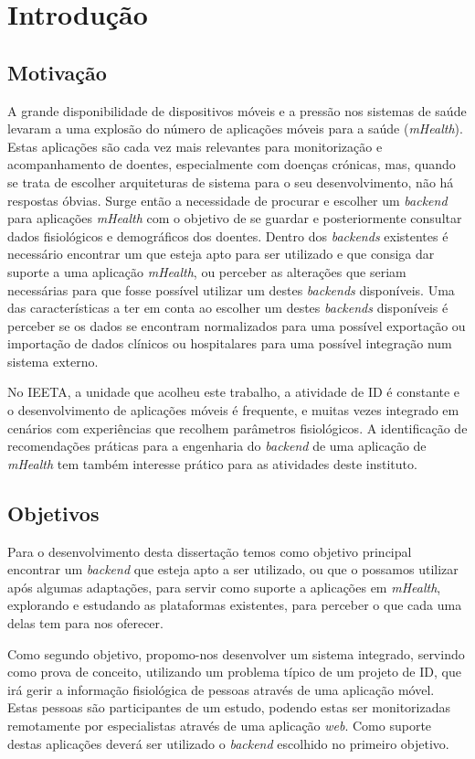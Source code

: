 \chapter{Introdu\c c\~ao}

\section{Motivação}

A grande disponibilidade de dispositivos móveis e a pressão nos sistemas de saúde levaram a uma explosão do número de aplicações móveis para a saúde (\textit{mHealth}). Estas aplicações são cada vez mais relevantes para monitorização e acompanhamento de doentes, especialmente com doenças crónicas\cite{mHealth-chronic-disease}, mas, quando se trata de escolher arquiteturas de sistema para o seu desenvolvimento, não há respostas óbvias. Surge então a necessidade de procurar e escolher um \textit{backend} para aplicações \textit{mHealth} com o objetivo de se guardar e posteriormente consultar dados fisiológicos e demográficos dos doentes.
Dentro dos \textit{backends} existentes é necessário encontrar um que esteja apto para ser utilizado e que consiga dar suporte a uma aplicação \textit{mHealth}, ou perceber as alterações que seriam necessárias para que fosse possível utilizar um destes \textit{backends} disponíveis. Uma das características a ter em conta ao escolher um destes \textit{backends} disponíveis é perceber se os dados se encontram normalizados para uma possível exportação ou importação de dados clínicos ou hospitalares para uma possível integração num sistema externo. \par
No \gls{IEETA}, a unidade que acolheu este trabalho, a atividade de \gls{ID} é constante e o desenvolvimento de aplicações móveis é frequente, e muitas vezes integrado em cenários com experiências que recolhem parâmetros fisiológicos. A identificação de recomendações práticas para a engenharia do \textit{backend} de uma aplicação de \textit{mHealth} tem também interesse prático para as atividades deste instituto.

\section{Objetivos}
Para o desenvolvimento desta dissertação temos como objetivo principal encontrar um \textit{backend} que esteja apto a ser utilizado, ou que o possamos utilizar após algumas adaptações, para servir como suporte a aplicações em \textit{mHealth}, explorando e estudando as plataformas existentes, para perceber o que cada uma delas tem para nos oferecer. \par
Como segundo objetivo, propomo-nos desenvolver um sistema integrado, servindo como prova de conceito, utilizando um problema típico de um projeto de \gls{ID}, que irá gerir a informação fisiológica de pessoas através de uma aplicação móvel. Estas pessoas são participantes de um estudo, podendo estas ser monitorizadas remotamente por especialistas através de uma aplicação \textit{web}. Como suporte destas aplicações deverá ser utilizado o \textit{backend} escolhido no primeiro objetivo.


